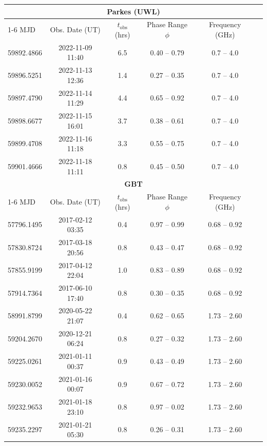 \begin{table}

    \centering
    \footnotesize
    \begin{tabular}{lccccc}
        \toprule
        \multicolumn{6}{c}{\textbf{Parkes (UWL)}} \\
        \cmidrule(r){1-6}
        MJD & Obs. Date (UT) & $t_{\text{obs}}$ (hrs) & Phase Range $\phi$ & Frequency (GHz) & \\
        \midrule
        59892.4866 & 2022-11-09 11:40 & 6.5  & 0.40 -- 0.79 & 0.7 -- 4.0 \\
        59896.5251 & 2022-11-13 12:36 & 1.4  & 0.27 -- 0.35 & 0.7 -- 4.0 \\
        59897.4790 & 2022-11-14 11:29 & 4.4  & 0.65 -- 0.92 & 0.7 -- 4.0 \\
        59898.6677 & 2022-11-15 16:01 & 3.7  & 0.38 -- 0.61 & 0.7 -- 4.0 \\
        59899.4708 & 2022-11-16 11:18 & 3.3  & 0.55 -- 0.75 & 0.7 -- 4.0 \\
        59901.4666 & 2022-11-18 11:11 & 0.8  & 0.45 -- 0.50 & 0.7 -- 4.0 \\
        \midrule
        \multicolumn{6}{c}{\textbf{GBT}} \\
        \cmidrule(r){1-6}
        MJD & Obs. Date (UT) & $t_{\text{obs}}$ (hrs) & Phase Range $\phi$ & Frequency (GHz) & \\
        \midrule
        57796.1495 & 2017-02-12 03:35 & 0.4 & 0.97 -- 0.99 & 0.68 -- 0.92 \\
        57830.8724 & 2017-03-18 20:56 & 0.8 & 0.43 -- 0.47 & 0.68 -- 0.92 \\
        57855.9199 & 2017-04-12 22:04 & 1.0 & 0.83 -- 0.89 & 0.68 -- 0.92 \\
        57914.7364 & 2017-06-10 17:40 & 0.8 & 0.30 -- 0.35 & 0.68 -- 0.92 \\
        58991.8799 & 2020-05-22 21:07 & 0.4 & 0.62 -- 0.65 & 1.73 -- 2.60 \\
        59204.2670 & 2020-12-21 06:24 & 0.8 & 0.27 -- 0.32 & 1.73 -- 2.60 \\
        59225.0261 & 2021-01-11 00:37 & 0.9 & 0.43 -- 0.49 & 1.73 -- 2.60 \\
        59230.0052 & 2021-01-16 00:07 & 0.9 & 0.67 -- 0.72 & 1.73 -- 2.60 \\
        59232.9653 & 2021-01-18 23:10 & 0.8 & 0.97 -- 0.02 & 1.73 -- 2.60 \\
        59235.2297 & 2021-01-21 05:30 & 0.8 & 0.26 -- 0.31 & 1.73 -- 2.60 \\

\end{tabular}
\end{table}
